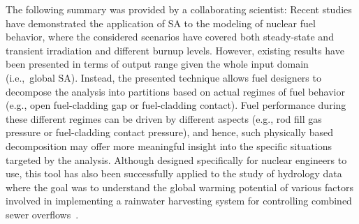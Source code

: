 The following summary was provided by a collaborating scientist: Recent studies~\cite{BouloreStruzikGaudier2012,IkonenTulkki2014,PastoreSwilerHales2015} have demonstrated the application of SA to the modeling of nuclear fuel behavior, where the considered scenarios have covered both steady-state and transient irradiation and different burnup levels.
%
However, existing results have been presented in terms of output range given the whole input domain (i.e.,\ global SA).
%
Instead, the presented technique allows fuel designers to decompose the analysis into partitions based on actual regimes of fuel behavior (e.g., open fuel-cladding gap or fuel-cladding contact).
%
Fuel performance during these different regimes can be driven by different aspects (e.g., rod fill gas pressure or fuel-cladding contact pressure), and hence, such physically based decomposition may offer more meaningful insight into the specific situations targeted by the analysis.
%
Although designed specifically for nuclear engineers to use, this tool has also been successfully applied to the study of hydrology data where the goal was to understand the global warming potential of various factors involved in implementing a rainwater harvesting system for controlling combined sewer overflows~\cite{Tavakol-Davani2016}.


% 